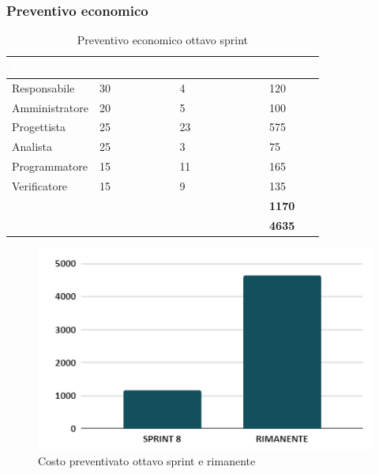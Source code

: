 \newpage

\subsubsection{Preventivo economico}

{
\setlength{\tabcolsep}{10pt}
\renewcommand{\arraystretch}{1.5}
\begin{table}[h]
    \centering
    \begin{tabularx}{\textwidth}{| l | l | l | X |}
        \hline
        \rowcolor{headerrow} \textbf{\textcolor{white}{Ruolo}} & \textbf{\textcolor{white}{Costo orario}} & \textbf{\textcolor{white}{Ore impiegate}} & \textbf{\textcolor{white}{Costo €}} \\
        \hline
        Responsabile & 30 & 4 & 120\\
        \hline
        Amministratore & 20 & 5 & 100\\
        \hline
        Progettista& 25 & 23  & 575\\
        \hline
        Analista & 25 & 3& 75\\
        \hline
        Programmatore & 15 & 11 & 165\\
        \hline
        Verificatore & 15 & 9 & 135\\
        \hline
        \cellcolor{headerrow} \textbf{\textcolor{white}{Totale}} &  &  & \textbf{1170}\\
        \hline
        \cellcolor{headerrow} \textbf{\textcolor{white}{Rimanente}} &  &  & \textbf{4635}\\
        \hline
    \end{tabularx}
    \caption{Preventivo economico ottavo sprint}
    \label{tab:preventivocostiottavosprint}
\end{table}
}

\begin{figure}[h!]
    \centering
    \includegraphics[width=\textwidth]{prev8costo.png}
    \caption{Costo preventivato ottavo sprint e rimanente}
    \label{fig:preventivocostoottavosprint}
\end{figure}


